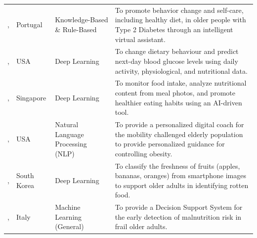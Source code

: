 \begin{longtable}{p{}p{}p{}p{}}
    \bottomrule
    \endlastfoot

    \citeauthor{balsaUsabilityIntelligentVirtual2020}, \citeyear{balsaUsabilityIntelligentVirtual2020}                                 & Portugal          & Knowledge-Based \& Rule-Based     & To promote behavior change and self-care, including healthy diet, in older people with Type 2 Diabetes through an intelligent virtual assistant.                                                                                       \\
    \addlinespace
    \citeauthor{chatterjeeDesigningInternetofThingsIoT2018}, \citeyear{chatterjeeDesigningInternetofThingsIoT2018}                     & USA               & Deep Learning                     & To change dietary behaviour and predict next-day blood glucose levels using daily activity, physiological, and nutritional data.                                                                                                       \\
    \addlinespace
    \citeauthor{chewADLDigitalToolkit2025}, \citeyear{chewADLDigitalToolkit2025}                                                       & Singapore         & Deep Learning                     & To monitor food intake, analyze nutritional content from meal photos, and promote healthier eating habits using an AI-driven tool.                                                                                                     \\
    \addlinespace
    \citeauthor{chopraDigiMateLeveragingLarge2024}, \citeyear{chopraDigiMateLeveragingLarge2024}                                       & USA               & Natural Language Processing (NLP) & To provide a personalized digital coach for the mobility challenged elderly population to provide personalized guidance for controlling obesity.                                                                                       \\
    \addlinespace
    \citeauthor{chunDeepLearningBased2024}, \citeyear{chunDeepLearningBased2024}                                                       & South Korea       & Deep Learning                     & To classify the freshness of fruits (apples, bananas, oranges) from smartphone images to support older adults in identifying rotten food.                                                                                              \\
    \addlinespace
    \citeauthor{dimartinoMalnutritionRiskAssessment2021}, \citeyear{dimartinoMalnutritionRiskAssessment2021}                           & Italy             & Machine Learning (General)        & To provide a Decision Support System for the early detection of malnutrition risk in frail older adults.                                                                                                                               \\

\end{longtable}
